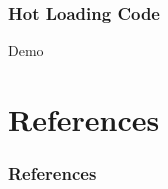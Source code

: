 \documentclass{beamer}
\begin{document}
\begin{frame}
\frametitle{Hot Loading Code}
\Huge{Demo}
\end{frame}

\section*{References}
\begin{frame}[allowframebreaks]
\frametitle{References}
\nocite{*}
\renewcommand{\refname}{}


\end{frame}

\end{document}
